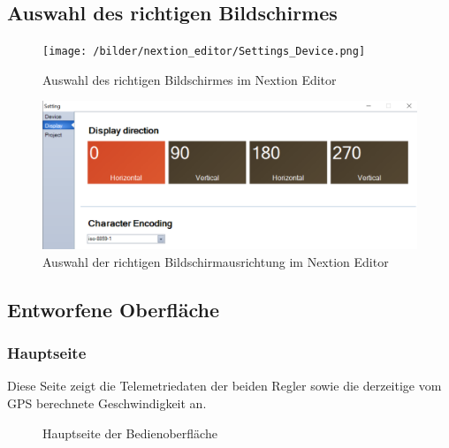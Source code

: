 \newpage
\subsection{Auswahl des richtigen Bildschirmes}
\begin{figure}[h]
    \centering
    \texttt{[image: /bilder/nextion\_editor/Settings\_Device.png]}
    \caption{Auswahl des richtigen Bildschirmes im Nextion Editor}
\end{figure}

\begin{figure}[h]
    \centering
    \includegraphics[width=\textwidth]{bilder/nextion_editor/Settings_Display.png}
    \caption{Auswahl der richtigen Bildschirmausrichtung im Nextion Editor}
\end{figure}

\newpage
\subsection{Entworfene Oberfläche}
\subsubsection{Hauptseite}
Diese Seite zeigt die Telemetriedaten der beiden Regler sowie die derzeitige vom GPS berechnete Geschwindigkeit an.
\begin{figure}[h]
    \centering
    \caption{Hauptseite der Bedienoberfläche}
\end{figure}
\newpage

